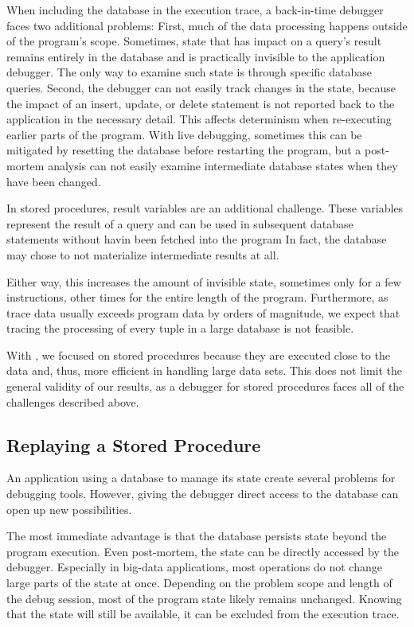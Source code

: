 When including the database in the execution trace, a back-in-time debugger faces two additional problems:
First, much of the data processing happens outside of the program's scope.
Sometimes, state that has impact on a query's result remains entirely in the database and is practically invisible to the application debugger.
The only way to examine such state is through specific database queries.
Second, the debugger can not easily track changes in the state, because the impact of an insert, update, or delete statement is not reported back to the application in the necessary detail.
This affects determinism when re-executing earlier parts of the program.
With live debugging, sometimes this can be mitigated by resetting the database before restarting the program, but a post-mortem analysis can not easily examine intermediate database states when they have been changed.

In stored procedures, result variables are an additional challenge.
These variables represent the result of a query and can be used in subsequent database statements without havin been fetched into the program
In fact, the database may chose to not materialize intermediate results at all.

\tmpStart
Either way, this increases the amount of invisible state, sometimes only for a few instructions, other times for the entire length of the program.
Furthermore, as trace data usually exceeds program data by orders of magnitude, we expect that tracing the processing of every tuple in a large database is not feasible.

With \tool, we focused on stored procedures because they are executed close to the data and, thus, more efficient in handling large data sets.
This does not limit the general validity of our results, as a debugger for stored procedures faces all of the challenges described above.
\tmpEnd

\subsection{Replaying a Stored Procedure}

An application using a database to manage its state create several problems for debugging tools.
However, giving the debugger direct access to the database can open up new possibilities.

The most immediate advantage is that the database persists state beyond the program execution.
Even post-mortem, the state can be directly accessed by the debugger.
Especially in big-data applications, most operations do not change large parts of the state at once.
Depending on the problem scope and length of the debug session, most of the program state likely remains unchanged.
Knowing that the state will still be available, it can be excluded from the execution trace.

